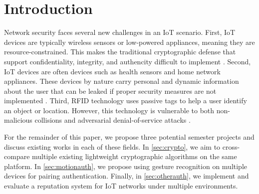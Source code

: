 
\section{Introduction}
\label{sec:Introduction}

Network security faces several new challenges in an \gls{IoT} scenario. First, \gls{IoT} devices are typically wireless sensors or low-powered appliances, meaning they are resource-constrained. This makes the traditional cryptographic defense that support confidentiality, integrity, and authencity difficult to implement \cite{authmodels}. Second, \gls{IoT} devices are often devices such as health sensors and home network appliances. These devices by nature carry personal and dynamic information about the user that can be leaked if proper security measures are not implemented \cite{Jing}. Third, \gls{RFID} technology uses passive tags to help a user identify an object or location. However, this technology is vulnerable to both non-malicious collisions and adversarial denial-of-service attacks \cite{RFID}. 

For the remainder of this paper, we propose three potential semester projects and discuss existing works in each of these fields. In \autoref{sec:crypto}, we aim to cross-compare multiple existing lightweight cryptographic algorithms on the same platform. In \autoref{sec:motionauth}, we propose using gesture recognition on multiple devices for pairing authentication. Finally, in \autoref{sec:otherauth}, we implement and evaluate a reputation system for \gls{IoT} networks under multiple environments. 